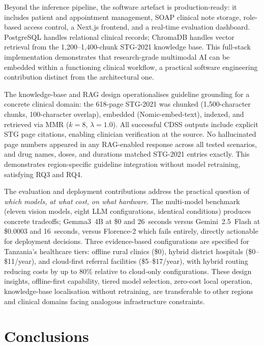 \documentclass[12pt,a4paper]{report}
\begin{document}
Beyond the inference pipeline, the software artefact is production-ready: it
includes patient and appointment management, SOAP clinical note storage,
role-based access control, a Next.js frontend, and a real-time evaluation
dashboard. PostgreSQL handles relational clinical records; ChromaDB handles
vector retrieval from the 1,200--1,400-chunk STG-2021 knowledge base. This
full-stack implementation demonstrates that research-grade multimodal AI can be
embedded within a functioning clinical workflow, a practical software engineering
contribution distinct from the architectural one.

The knowledge-base and RAG design operationalises guideline grounding for a
concrete clinical domain: the 618-page STG-2021 was chunked (1,500-character
chunks, 100-character overlap), embedded (Nomic-embed-text), indexed, and
retrieved via MMR ($k{=}8$, $\lambda{=}1.0$). All successful CDSS outputs
include explicit STG page citations, enabling clinician verification at the
source. No hallucinated page numbers appeared in any RAG-enabled response
across all tested scenarios, and drug names, doses, and durations matched
STG-2021 entries exactly. This demonstrates region-specific guideline
integration without model retraining, satisfying RQ3 and RQ4.

The evaluation and deployment contributions address the practical question of
\emph{which models, at what cost, on what hardware}. The multi-model benchmark
(eleven vision models, eight LLM configurations, identical conditions)
produces concrete tradeoffs; Gemma3~4B at \$0 and 26~seconds versus
Gemini~2.5~Flash at \$0.0003 and 16~seconds, versus Florence-2 which fails
entirely, directly actionable for deployment decisions. Three evidence-based
configurations are specified for Tanzania's healthcare tiers: offline rural
clinics (\$0), hybrid district hospitals (\$0--\$11/year), and cloud-first
referral facilities (\$5--\$17/year), with hybrid routing reducing costs by
up to 80\% relative to cloud-only configurations. These design insights, offline-first capability, tiered model selection, zero-cost local operation,
knowledge-base localisation without retraining, are transferable to other
regions and clinical domains facing analogous infrastructure constraints.

\section{Conclusions}
\label{sec:conclusion_conclusions}
\end{document}
